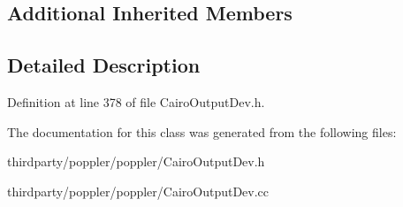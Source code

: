 \subsection*{Additional Inherited Members}


\subsection{Detailed Description}


Definition at line 378 of file Cairo\+Output\+Dev.\+h.



The documentation for this class was generated from the following files\+:\begin{DoxyCompactItemize}
\item 
thirdparty/poppler/poppler/Cairo\+Output\+Dev.\+h\item 
thirdparty/poppler/poppler/Cairo\+Output\+Dev.\+cc\end{DoxyCompactItemize}
